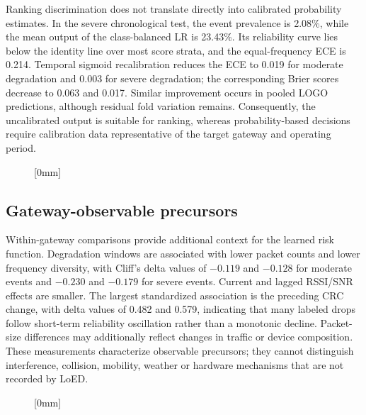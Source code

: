 \documentclass{jot}
\begin{document}
Ranking discrimination does not translate directly into calibrated probability estimates. In the severe chronological test, the event prevalence is 2.08\%, while the mean output of the class-balanced LR is 23.43\%. Its reliability curve lies below the identity line over most score strata, and the equal-frequency ECE is 0.214. Temporal sigmoid recalibration reduces the ECE to 0.019 for moderate degradation and 0.003 for severe degradation; the corresponding Brier scores decrease to 0.063 and 0.017. Similar improvement occurs in pooled LOGO predictions, although residual fold variation remains. Consequently, the uncalibrated output is suitable for ranking, whereas probability-based decisions require calibration data representative of the target gateway and operating period.

\begin{figure}[t]
[0mm]
\end{figure}

\subsection{Gateway-observable precursors}\label{s:4.10}

Within-gateway comparisons provide additional context for the learned risk function. Degradation windows are associated with lower packet counts and lower frequency diversity, with Cliff's delta values of $-0.119$ and $-0.128$ for moderate events and $-0.230$ and $-0.179$ for severe events. Current and lagged RSSI/SNR effects are smaller. The largest standardized association is the preceding CRC change, with delta values of 0.482 and 0.579, indicating that many labeled drops follow short-term reliability oscillation rather than a monotonic decline. Packet-size differences may additionally reflect changes in traffic or device composition. These measurements characterize observable precursors; they cannot distinguish interference, collision, mobility, weather or hardware mechanisms that are not recorded by LoED.

\begin{figure}[t]
[0mm]
\end{figure}
\end{document}
